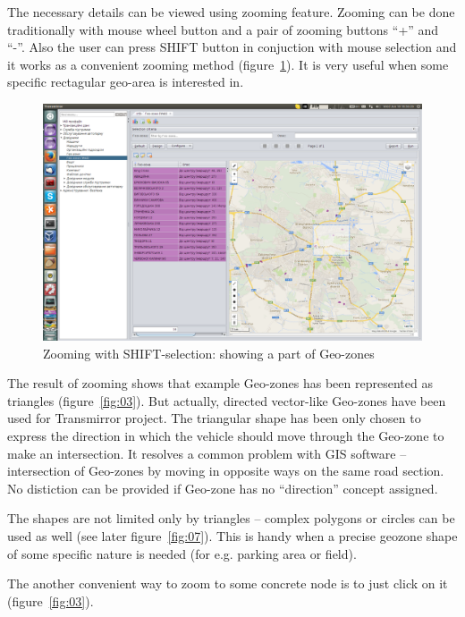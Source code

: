 \newpage
The necessary details can be viewed using zooming feature. Zooming can be done traditionally with mouse wheel button and a pair of zooming buttons ``+'' and ``-''. Also the user can press SHIFT button in conjuction with mouse selection and it works as a convenient zooming method (figure~\ref{fig:02}). It is very useful when some specific rectagular geo-area is interested in. 

\begin{figure}[H]
\centering
\includegraphics[width=\linewidth]{chapters/01-geozones/images/02-part-of-geo-zones-using-shift+selection-zoom.png}
\caption{Zooming with SHIFT-selection: showing a part of Geo-zones}\label{fig:02}
\end{figure}

\newpage
The result of zooming shows that example Geo-zones has been represented as triangles (figure~\ref{fig:03}). But actually, directed vector-like Geo-zones have been used for Transmirror project. The triangular shape has been only chosen to express the direction in which the vehicle should move through the Geo-zone to make an intersection. It resolves a common problem with GIS software -- intersection of Geo-zones by moving in opposite ways on the same road section. No distiction can be provided if Geo-zone has no ``direction'' concept assigned.

The shapes are not limited only by triangles -- complex polygons or circles can be used as well (see later figure~\ref{fig:07}). This is handy when a precise geozone shape of some specific nature is needed (for e.g. parking area or field).

The another convenient way to zoom to some concrete node is to just click on it (figure~\ref{fig:03}).

